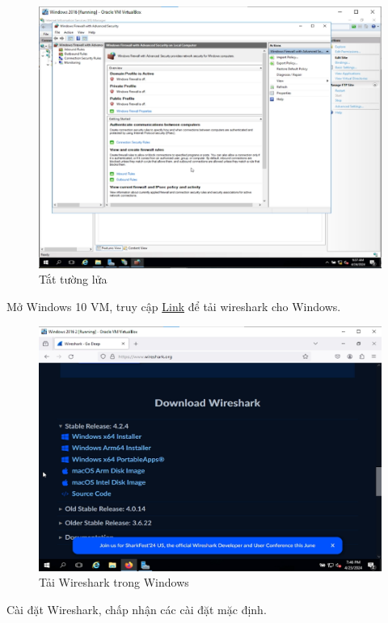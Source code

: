 \begin{figure}[!htb]
    \centering
    \includegraphics[width=0.85\linewidth]{figure//chapter9//lab9_2/turn_off_fw.png}
    \caption{Tắt tường lửa}
    \label{fig:enter-label}
\end{figure}

 Mở Windows 10 VM, truy cập \href{https://www.wireshark.org/download.html}{Link} để tải wireshark cho Windows.

\begin{figure}[!htb]
    \centering
    \includegraphics[width=0.9\linewidth]{figure//chapter9//lab9_2/download_wireshark.png}
    \caption{Tải Wireshark trong Windows}
    \label{fig:enter-label}
\end{figure}

 Cài đặt Wireshark, chấp nhận các cài đặt mặc định.

